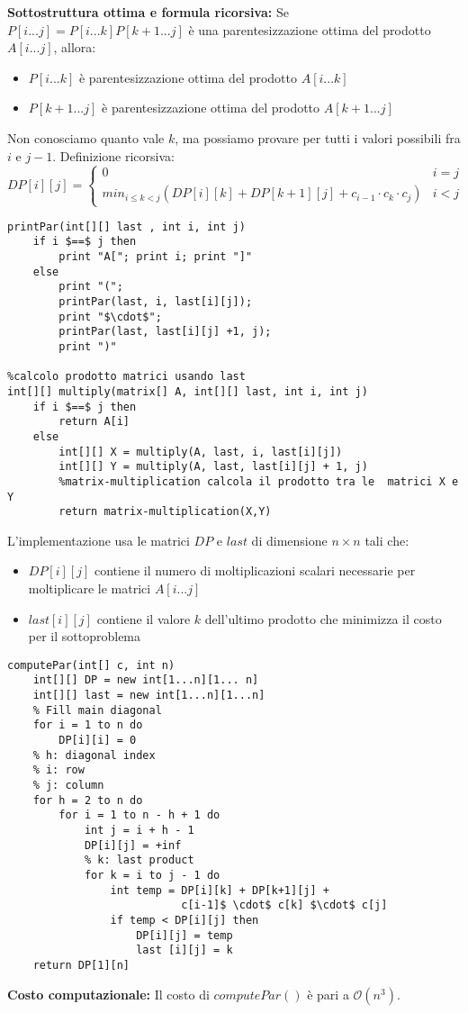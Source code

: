 \documentclass[../cheatSheetAlgoritmi.tex]{subfiles}
\begin{document}
\textbf{Sottostruttura ottima e formula ricorsiva:} Se $P[i...j] = P[i...k]P[k+1...j]$ è una parentesizzazione ottima del prodotto $A[i...j]$, allora:
\begin{itemize}
	\item $P[i...k]$ è parentesizzazione ottima del prodotto $A[i...k]$
	\item $P[k+1...j]$ è parentesizzazione ottima del prodotto $A[k+1...j]$
\end{itemize}
Non conosciamo quanto vale $k$, ma possiamo provare per tutti i valori possibili fra $i$ e $j-1$.
Definizione ricorsiva:
\begin{equation*}
  	DP[i][j] =\begin{cases}
    	0 & \text{$i = j$}\\
    	min_{i \leq k < j}(DP[i][k]+DP[k+1][j]+c_{i-1} \cdot c_{k} \cdot c_{j})  & \text{$i < j$}  
  	\end{cases}
\end{equation*}
\newpage
\begin{lstlisting}[caption= Calcolo prodotto di matrici e stampa parentesizzazione ottima usando matrice last]
%ricostruzione della soluzione (stampa prodotto)
printPar(int[][] last , int i, int j)
	if i $==$ j then
		print "A["; print i; print "]"
	else
		print "(";
		printPar(last, i, last[i][j]);
		print "$\cdot$";
		printPar(last, last[i][j] +1, j);
		print ")"

%calcolo prodotto matrici usando last 
int[][] multiply(matrix[] A, int[][] last, int i, int j)
	if i $==$ j then
		return A[i]
	else
		int[][] X = multiply(A, last, i, last[i][j])
		int[][] Y = multiply(A, last, last[i][j] + 1, j)
		%matrix-multiplication calcola il prodotto tra le  matrici X e Y
		return matrix-multiplication(X,Y)
\end{lstlisting}
\noindent
L'implementazione usa le matrici $DP$ e $last$ di dimensione $n \times n$ tali che:
\begin{itemize}
	\item $DP[i][j]$ contiene il numero di moltiplicazioni scalari necessarie per moltiplicare le matrici $A[i...j]$ 
	\item $last [i][j]$ contiene il valore $k$ dell'ultimo prodotto che minimizza il costo per il sottoproblema
\end{itemize}
\begin{lstlisting}[caption= Calcolo parentesizzazione ottima]
%calcolo della soluzione ottima
computePar(int[] c, int n)
	int[][] DP = new int[1...n][1... n]
	int[][] last = new int[1...n][1...n]
	% Fill main diagonal
	for i = 1 to n do 
		DP[i][i] = 0
	% h: diagonal index
	% i: row
	% j: column
	for h = 2 to n do
		for i = 1 to n - h + 1 do 
			int j = i + h - 1 
			DP[i][j] = +inf
			% k: last product
			for k = i to j - 1 do 
				int temp = DP[i][k] + DP[k+1][j] + 
				           c[i-1]$ \cdot$ c[k] $\cdot$ c[j]
				if temp < DP[i][j] then
					DP[i][j] = temp
					last [i][j] = k
	return DP[1][n]
\end{lstlisting}
\textbf{Costo computazionale:} Il costo di $computePar()$ è pari a $\mathcal{O}(n^{3})$.
\newpage
\end{document}
